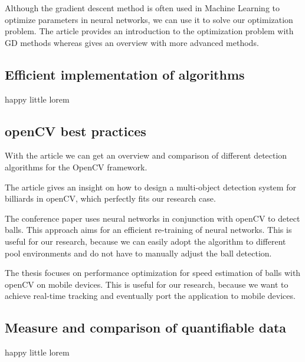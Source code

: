 \documentclass[titlepage, a4paper, 11pt]{scrartcl}
\begin{document}
Although the gradient descent method is often used in Machine Learning to optimize parameters in neural networks, we can use it to solve our optimization problem.
The article \citep{ketkar2017deep} provides an introduction to the optimization problem with GD methods whereas \citep{marti2005stochastic} gives an overview with more advanced methods.


\subsection{Efficient  implementation  of  algorithms}

happy little lorem

\subsection{openCV best practices}

With the article \citep{janku2016comparison} we can get an overview and comparison of different detection algorithms for the OpenCV framework.

The article \citep{gao2018design} gives an insight on how to design a multi-object detection system for billiards in openCV, which perfectly fits our research case.

The conference paper \citep{gabel2018jetson} uses neural networks in conjunction with openCV to detect balls.
This approach aims for an efficient re-training of neural networks. This is useful for our research, because we can easily adopt the algorithm to different pool environments and do not have to manually adjust the ball detection.

The thesis \citep{schmidt2016measuring} focuses on performance optimization for speed estimation of balls with openCV on mobile devices. This is useful for our research, because we want to achieve real-time tracking and eventually port the application to mobile devices.

\subsection{Measure and comparison of quantifiable data}

happy little lorem

 

\end{document}
